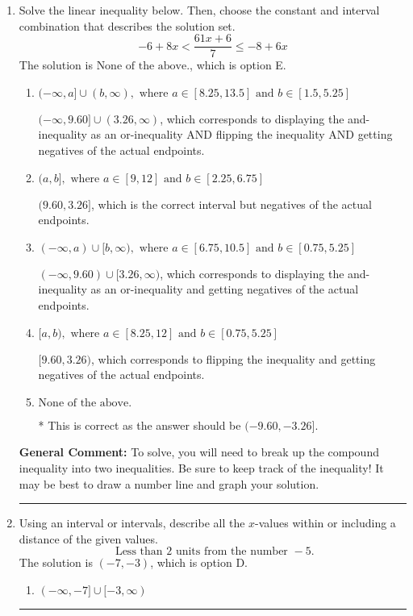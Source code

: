 \documentclass{extbook}[14pt]
\newcommand{\litem}[1]{\item #1

\rule{\textwidth}{0.4pt}}
\begin{document}
\begin{enumerate}
{\begin{enumerate}[label=\Alph*.]
Corresponds to including the endpoints (when they should be excluded).
\item \( (-\infty, \infty) \)

Corresponds to the variable canceling, which does not happen in this instance.
\end{enumerate}

\textbf{General Comment:} When multiplying or dividing by a negative, flip the sign.
}
\litem{
Solve the linear inequality below. Then, choose the constant and interval combination that describes the solution set.
\[ -6 + 8 x < \frac{61 x + 6}{7} \leq -8 + 6 x \]The solution is \( \text{None of the above.} \), which is option E.\begin{enumerate}[label=\Alph*.]
\item \( (-\infty, a] \cup (b, \infty), \text{ where } a \in [8.25, 13.5] \text{ and } b \in [1.5, 5.25] \)

$(-\infty, 9.60] \cup (3.26, \infty)$, which corresponds to displaying the and-inequality as an or-inequality AND flipping the inequality AND getting negatives of the actual endpoints.
\item \( (a, b], \text{ where } a \in [9, 12] \text{ and } b \in [2.25, 6.75] \)

$(9.60, 3.26]$, which is the correct interval but negatives of the actual endpoints.
\item \( (-\infty, a) \cup [b, \infty), \text{ where } a \in [6.75, 10.5] \text{ and } b \in [0.75, 5.25] \)

$(-\infty, 9.60) \cup [3.26, \infty)$, which corresponds to displaying the and-inequality as an or-inequality and getting negatives of the actual endpoints.
\item \( [a, b), \text{ where } a \in [8.25, 12] \text{ and } b \in [0.75, 5.25] \)

$[9.60, 3.26)$, which corresponds to flipping the inequality and getting negatives of the actual endpoints.
\item \( \text{None of the above.} \)

* This is correct as the answer should be $(-9.60, -3.26]$.
\end{enumerate}

\textbf{General Comment:} To solve, you will need to break up the compound inequality into two inequalities. Be sure to keep track of the inequality! It may be best to draw a number line and graph your solution.
}
\litem{
Using an interval or intervals, describe all the $x$-values within or including a distance of the given values.
\[ \text{ Less than } 2 \text{ units from the number } -5. \]The solution is \( (-7, -3) \), which is option D.\begin{enumerate}[label=\Alph*.]
\item \( (-\infty, -7] \cup [-3, \infty) \)


\end{enumerate}}
\end{enumerate}
\end{document}
